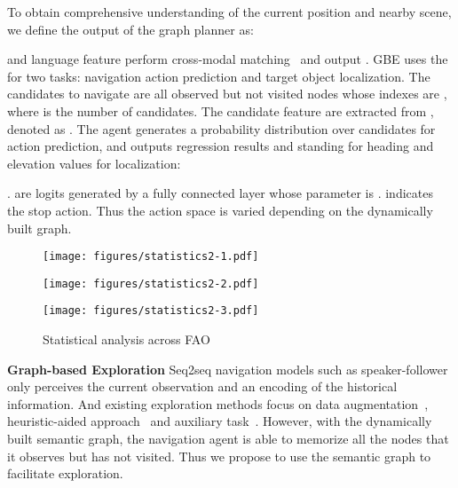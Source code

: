 \documentclass[final]{cvpr}
\begin{document}
To obtain comprehensive understanding of the current position and nearby scene, 
we define the output of the graph planner as: 

 and language feature  perform cross-modal matching~\cite{wang2018reinforced} and output . 
GBE uses the  for two tasks: navigation action prediction and target object localization. 
The candidates to navigate are all observed but not visited nodes whose indexes are , where  is the number of candidates. 
The candidate feature are extracted from , denoted as . 
The agent generates a probability distribution  over candidates for action prediction, and outputs regression results  and  standing for heading and elevation values for localization: 

.  are logits generated by a fully connected layer whose parameter is  .  indicates the stop action. Thus the action space  is varied depending on the dynamically built graph. 


\begin{figure*}[t]
\centering
\begin{minipage}{.33\textwidth}
    \centering
    \texttt{[image: figures/statistics2-1.pdf]}
\end{minipage}
\begin{minipage}{.33\textwidth}
    \centering
    \texttt{[image: figures/statistics2-2.pdf]}
\end{minipage}
\begin{minipage}{.33\textwidth}
    \centering
    \texttt{[image: figures/statistics2-3.pdf]}
\end{minipage}
\caption{Statistical analysis across FAO}
\vspace{-9pt}
\label{fig:analysis}
\end{figure*}

\noindent\textbf{Graph-based Exploration} Seq2seq navigation models such as speaker-follower~\cite{fried2018speaker} only perceives the current observation and an encoding of the historical information. And existing exploration methods focus on data augmentation~\cite{tan2019learning}, heuristic-aided approach~\cite{ma2019the} and auxiliary task~\cite{zhu2019vision}. 
However, with the dynamically built semantic graph, the navigation agent is able to memorize all the nodes that it observes but has not visited. 
Thus we propose to use the semantic graph to facilitate exploration. 
\end{document}
